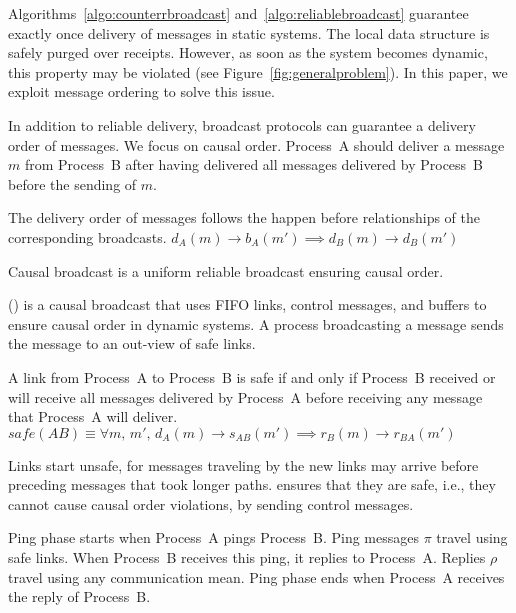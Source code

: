 Algorithms~\ref{algo:counterrbroadcast} and~\ref{algo:reliablebroadcast}
guarantee exactly once delivery of messages in static systems. The local data
structure is safely purged over receipts. However, as soon as the system becomes
dynamic, this property may be violated (see Figure~\ref{fig:generalproblem}). In
this paper, we exploit message ordering to solve this issue.

In addition to reliable delivery, broadcast protocols can guarantee a delivery
order of messages. We focus on causal order. Process~A should deliver a message
$m$ from Process~B after having delivered all messages delivered by Process~B
before the sending of $m$.

\begin{definition}
  The delivery order of messages follows the happen before relationships of the
  corresponding broadcasts.
  $d_A(m) \rightarrow b_A(m') \implies d_B(m) \rightarrow d_B(m')$
\end{definition}

\begin{definition}
  Causal broadcast is a uniform reliable broadcast ensuring causal order.
\end{definition}

\PCBROADCAST (\REF) is a causal broadcast that uses FIFO links, control
messages, and buffers to ensure causal order in dynamic systems. A process
broadcasting a message sends the message to an out-view of safe links.

\begin{definition}  
  A link from Process~A to Process~B is safe if and only if Process~B received
  or will receive all messages delivered by Process~A before receiving any
  message that Process~A will
  deliver. $safe(AB) \equiv \forall m,\, m',\, d_A(m) \rightarrow s_{AB}(m')
  \implies r_B(m) \rightarrow r_{BA}(m')$
\end{definition}

Links start unsafe, for messages traveling by the new links may arrive before
preceding messages that took longer paths. \PCBROADCAST ensures that they are
safe, i.e., they cannot cause causal order violations, by sending control
messages.

\begin{definition}
  Ping phase starts when Process~A pings Process~B. Ping messages $\pi$ travel
  using safe links. When Process~B receives this ping, it replies to
  Process~A. Replies $\rho$ travel using any communication mean. Ping phase ends
  when Process~A receives the reply of Process~B.
\end{definition}

